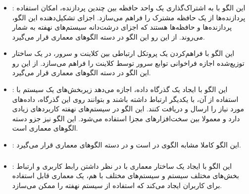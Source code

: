 \subsubsection{}
\begin{itemize}
\item {}: %
این الگو با به اشتراک‌گذاری یک واحد حافظه بین چندین پردازنده،
امکان استفاده پردازنده‌ها از یک حافظه مشترک را فراهم می‌سازد.
اجزای تشکیل‌دهنده این الگو، پردازنده‌ها و حافظه‌ها هستند که اجزای
درشت‌دانه سیستم‌های نهفته به ‌شمار می‌روند. از این رو این الگو در
دسته الگوهای معماری قرار می‌گیرد.
\item {} %
این الگو با فراهم‌کردن یک پروتکل ارتباطی بین کلاینت و سرور،
در یک ساختار توزیع‌شده اجازه فراخوانی توابع سرور توسط کلاینت را
فراهم می‌سازد. از این رو این الگو در دسته الگوهای معماری قرار می‌گیرد.
\item {}: %
این الگو با ایجاد یک گذرگاه داده، اجازه می‌دهد زیربخش‌های یک
سیستم با استفاده از آن، با یکدیگر ارتباط داشته باشند
و بتوانند روی این گذرگاه، داده‌های مورد نیاز را ارسال
و دریافت کنند. این الگو در سیستم‌های نهفته کاربردهای زیادی دارد
و معمولا بین سخت‌افزارهای مجزا استفاده می‌شود.
این الگو نیز جزو دسته الگوهای معماری است.
\item {}: %
این الگو کاملا مشابه الگوی  در \cite{ref6} است
و در دسته الگوهای معماری قرار می‌گیرد.
\end{itemize}

\subsubsection{}
\begin{itemize}
\item {}:
این الگو با ایجاد یک ساختار معماری با در نظر داشتن رابط کاربری و
ارتباط بخش‌های مختلف سیستم و سیستم‌های مختلف با هم، یک معماری
قابل استفاده برای کاربران ایجاد می‌کند که استفاده از سیستم نهفته را ممکن
می‌سازد. 
\end{itemize}

